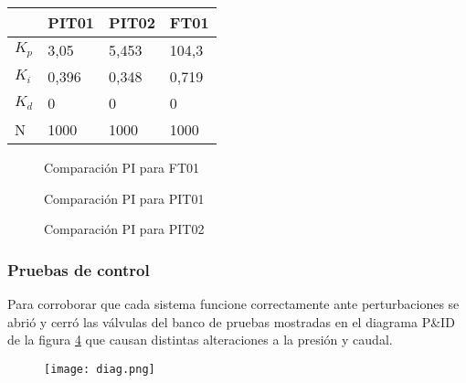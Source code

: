 {\begin{table}[h]
	\centering
	\begin{tabular}{|l|l|l|l|}
		\hline
		& PIT01 & PIT02 & FT01 \\ \hline
		$K_p$ & 3,05 & 5,453 & 104,3 \\ \hline
		$K_i$ & 0,396 & 0,348 & 0,719 \\ \hline
		$K_d$ & 0 & 0 & 0 \\ \hline
		N & 1000 & 1000 & 1000 \\ \hline
	\end{tabular}
	\label{tab:pid}
\end{table}

\begin{comment}
	C:\Users\glori\Desktop\DANIELA\VISUAL_DANI\Automa\MATLAB\22-05\Comparacion PID y PLANTAS\FT01
	Respuesta_Strenj
\end{comment}






\begin{figure}[h!]
	\centering
\hspace{-4mm}
	\caption{Comparación PI para FT01} \label{fig:FT1}
\end{figure}

\begin{figure}[h!]
	\centering
\hspace{-4mm}
	\caption{Comparación PI para PIT01} \label{fig:PIT1}
\end{figure}

\begin{figure}[h!]
	\centering
	\hspace{-4mm}
	\caption{Comparación PI para PIT02} \label{fig:PIT2}
\end{figure}

\clearpage
\subsubsection{Pruebas de control}

Para corroborar que cada sistema funcione correctamente ante perturbaciones se abrió y cerró las válvulas del banco de pruebas mostradas en el diagrama P\&ID de la figura \ref{fig:diag2} que causan distintas alteraciones a la presión y caudal.
\begin{figure}[h!]
	\centering
	\texttt{[image: diag.png]}
	\label{fig:diag2}
\end{figure}


}
